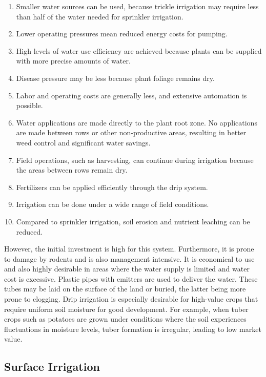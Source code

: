 \documentclass[
]{article}
\providecommand{\tightlist}{%
  \setlength{\itemsep}{0pt}\setlength{\parskip}{0pt}}
\begin{document}
\begin{enumerate}
\def\labelenumi{\arabic{enumi}.}
\tightlist
\item
  Smaller water sources can be used, because trickle irrigation may require less than half of the water needed for sprinkler irrigation.
\item
  Lower operating pressures mean reduced energy costs for pumping.
\item
  High levels of water use efficiency are achieved because plants can be supplied with more precise amounts of water.
\item
  Disease pressure may be less because plant foliage remains dry.
\item
  Labor and operating costs are generally less, and extensive automation is possible.
\item
  Water applications are made directly to the plant root zone. No applications are made between rows or other non-productive areas, resulting in better weed control and significant water savings.
\item
  Field operations, such as harvesting, can continue during irrigation because the areas between rows remain dry.
\item
  Fertilizers can be applied efficiently through the drip system.
\item
  Irrigation can be done under a wide range of field conditions.
\item
  Compared to sprinkler irrigation, soil erosion and nutrient leaching can be reduced.
\end{enumerate}

However, the initial investment is high for this system. Furthermore, it is prone to damage by rodents and is also management intensive. It is economical to use and also highly desirable in areas where the water supply is limited and water cost is excessive. Plastic pipes with emitters are used to deliver the water. These tubes may be laid on the surface of the land or buried, the latter being more prone to clogging. Drip irrigation is especially desirable for high-value crops that require uniform soil moisture for good development. For example, when tuber crops such as potatoes are grown under conditions where the soil experiences fluctuations in moisture levels, tuber formation is irregular, leading to low market value.

\hypertarget{surface-irrigation}{%
\subsection{Surface Irrigation}\label{surface-irrigation}}
\end{document}
